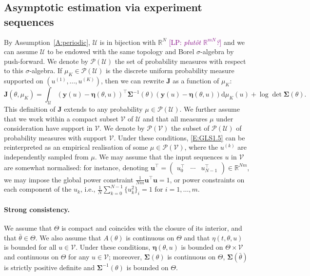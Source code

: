 \documentclass[a4paper]{article}
\newcommand{\LP}[1]{{\textcolor{purple}{[LP: \textit{#1}]}}}
\theoremstyle{definition}
\theoremstyle{remark}
\newcommand{\R}{\mathbb{R}}
\newcommand{\diff}{\mathrm{d}}
\newcommand{\U}{\mathcal{U}}
\newcommand{\V}{\mathcal{V}}
\renewcommand{\P}{\mathcal{P}}
\newcommand{\yb}{\mathbf{y}}
\newcommand{\ub}{\mathbf{u}}
\newcommand{\Jb}{\mathbf{J}}
\newcommand{\etab}{\boldsymbol{\eta}}
\newcommand{\Sigmab}{\boldsymbol{\Sigma}}
\begin{document}
\subsection{Asymptotic estimation via experiment sequences}
\label{S:FIM}
By Assumption~\ref{A:periodic}, $\mathcal{U}$ is in bijection with $\R^N$ \LP{plutôt $\R^{mN}$?} and we can assume $\mathcal{U}$ {to be} endowed with the same topology and Borel $\sigma$-algebra  by push-forward. We denote by $\P(\U)$ the set of probability measures with respect to this $\sigma$-algebra. If $\mu_K\in \P(\U)$ is the discrete uniform probability measure supported on $(u^{(1)},\dots, u^{(K)})$, then we can rewrite $\Jb$ as a function of $\mu_K$:
\begin{equation}\label{E:GLS3}
\Jb(\theta,\mu_K)
=
\int_\U
(\yb(u)-\etab(\theta,u))^\top 
\Sigmab^{-1}(\theta)
(\yb(u)-\etab(\theta,u))\diff \mu_K(u)+\log\det \Sigmab(\theta).
\end{equation}
This definition of $\Jb$ extends  to any probability $\mu\in \P(\U)$. We further assume that we work within a compact subset $\V$ of $\U$ and that all measures $\mu$ under consideration have support in $\V$. We denote by $\P(\V)$ the subset of $\P(\U)$ of probability measures with support $\V$.
Under these conditions, \eqref{E:GLS1.5} can be reinterpreted as an empirical realisation of some $\mu\in \P(\V)$, where the $u^{(k)}$ are independently sampled from $\mu$. We may assume that the input sequences $u$ in $\V$ are somewhat normalised: for instance, 
denoting $\ub^\top=\begin{pmatrix}
u_0^\top & \cdots & u_{N-1}^\top
\end{pmatrix}\in \R^{Nm}$,
we may impose the global power constraint $\frac{1}{Nm} \ub^\top\ub=1$, or power constraints on each component of the $u_k$, i.e., 
$\frac1N \sum_{k=0}^{N-1} \{u_k^2\}_i=1$ for $i=1,\ldots,m$. 


\paragraph{Strong consistency.}
We assume that $\Theta$ is compact and coincides with the closure of its interior, and that $\bar\theta\in\Theta$. We also assume that $A(\theta)$ is continuous on $\Theta$ and that $\eta(t,\theta,u)$ is bounded for all $u\in\V$. Under these conditions, $\etab(\theta,u)$ is bounded on $\Theta\times\V$ and continuous on $\Theta$ for any $u\in\V$; moreover, $\Sigmab(\theta)$ is continuous on $\Theta$, $\Sigmab(\bar\theta)$ is strictly positive definite and $\Sigmab^{-1}(\theta)$ is bounded on $\Theta$. 
\end{document}
